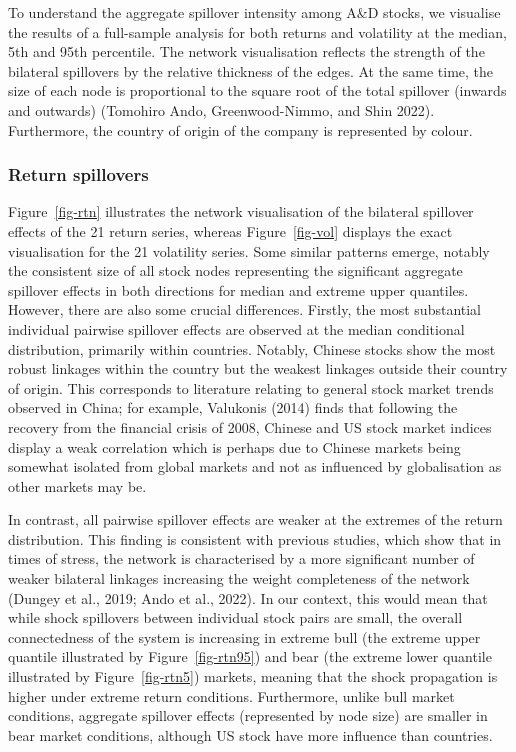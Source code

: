 \documentclass[
  letterpaper,
  DIV=11,
  numbers=noendperiod]{scrartcl}
\begin{document}
To understand the aggregate spillover intensity among A\&D stocks, we
visualise the results of a full-sample analysis for both returns and
volatility at the median, 5th and 95th percentile. The network
visualisation reflects the strength of the bilateral spillovers by the
relative thickness of the edges. At the same time, the size of each node
is proportional to the square root of the total spillover (inwards and
outwards) (Tomohiro Ando, Greenwood-Nimmo, and Shin 2022). Furthermore,
the country of origin of the company is represented by colour.

\hypertarget{return-spillovers}{%
\subsubsection{Return spillovers}\label{return-spillovers}}

Figure~\ref{fig-rtn} illustrates the network visualisation of the
bilateral spillover effects of the 21 return series, whereas
Figure~\ref{fig-vol} displays the exact visualisation for the 21
volatility series. Some similar patterns emerge, notably the consistent
size of all stock nodes representing the significant aggregate spillover
effects in both directions for median and extreme upper quantiles.
However, there are also some crucial differences. Firstly, the most
substantial individual pairwise spillover effects are observed at the
median conditional distribution, primarily within countries. Notably,
Chinese stocks show the most robust linkages within the country but the
weakest linkages outside their country of origin. This corresponds to
literature relating to general stock market trends observed in China;
for example, Valukonis (2014) finds that following the recovery from the
financial crisis of 2008, Chinese and US stock market indices display a
weak correlation which is perhaps due to Chinese markets being somewhat
isolated from global markets and not as influenced by globalisation as
other markets may be.

In contrast, all pairwise spillover effects are weaker at the extremes
of the return distribution. This finding is consistent with previous
studies, which show that in times of stress, the network is
characterised by a more significant number of weaker bilateral linkages
increasing the weight completeness of the network (Dungey et al., 2019;
Ando et al., 2022). In our context, this would mean that while shock
spillovers between individual stock pairs are small, the overall
connectedness of the system is increasing in extreme bull (the extreme
upper quantile illustrated by Figure~\ref{fig-rtn95}) and bear (the
extreme lower quantile illustrated by Figure~\ref{fig-rtn5}) markets,
meaning that the shock propagation is higher under extreme return
conditions. Furthermore, unlike bull market conditions, aggregate
spillover effects (represented by node size) are smaller in bear market
conditions, although US stock have more influence than countries.
\end{document}
